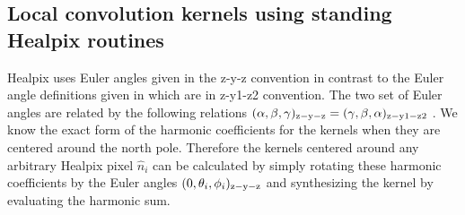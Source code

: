 \subsection{Local convolution kernels using standing Healpix routines}\label{sec:rot_ker_healpix}
Healpix uses Euler angles given in the z-y-z convention in contrast to the Euler angle definitions given in  which are in z-y1-z2 convention. The two set of Euler angles are related by the following relations $(\alpha,\beta,\gamma)_{\rm z-y-z} = (\gamma,\beta,\alpha)_{\rm z-y1-z2}$ \cite{varshalovich}. We know the exact form of the harmonic coefficients for the kernels when they are centered around the north pole. Therefore the kernels centered around any arbitrary Healpix pixel $\hat{n}_i$ can be calculated by simply rotating these harmonic coefficients by the Euler angles $(0,\theta_i,\phi_i)_{\rm z-y-z}$ and synthesizing the kernel by evaluating the harmonic sum.